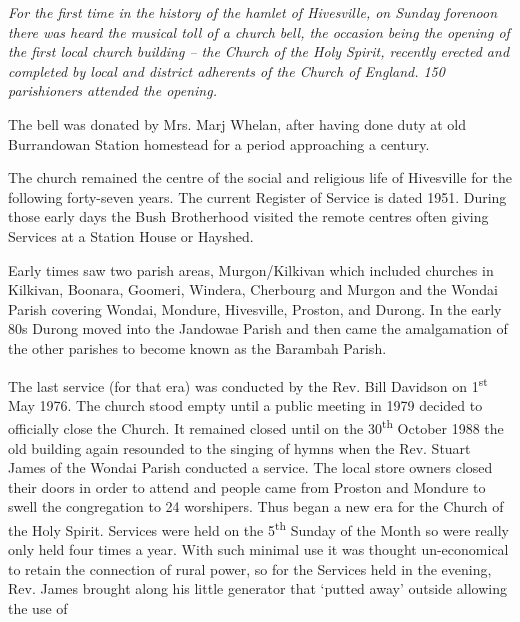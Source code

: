 \emph{For the first time in the history of the hamlet of Hivesville, on Sunday forenoon there was heard the musical toll of a church bell, the occasion being the opening of the first local church building -- the Church of the Holy Spirit, recently erected and completed by local and district adherents of the Church of England. 150 parishioners attended the opening.}



The bell was donated by Mrs. Marj Whelan, after having done duty at old Burrandowan Station homestead for a period approaching a century.



The church remained the centre of the social and religious life of Hivesville for the following forty-seven years. The current Register of Service is dated 1951. During those early days the Bush Brotherhood visited the remote centres often giving Services at a Station House or Hayshed.



Early times saw two parish areas, Murgon/Kilkivan which included churches in Kilkivan, Boonara, Goomeri, Windera, Cherbourg and Murgon and the Wondai Parish covering Wondai, Mondure, Hivesville, Proston, and Durong. In the early 80s Durong moved into the Jandowae Parish and then came the amalgamation of the other parishes to become known as the Barambah Parish.



The last service (for that era) was conducted by the Rev. Bill Davidson on 1\textsuperscript{st} May 1976. The church stood empty until a public meeting in 1979 decided to officially close the Church. It remained closed until on the 30\textsuperscript{th} October 1988 the old building again resounded to the singing of hymns when the Rev. Stuart James of the Wondai Parish conducted a service. The local store owners closed their doors in order to attend and people came from Proston and Mondure to swell the congregation to 24 worshipers. Thus began a new era for the Church of the Holy Spirit. Services were held on the 5\textsuperscript{th} Sunday of the Month so were really only held four times a year. With such minimal use it was thought un-economical to retain the connection of rural power, so for the Services held in the evening, Rev. James brought along his little generator that `putted away' outside allowing the use of




